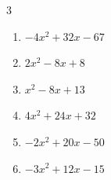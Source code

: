 \begin{multicols}{3}
\begin{enumerate}
  \item $-4x^{2}+32x-67$


  \item $2x^{2}-8x+8$


  \item $x^{2}-8x+13$


  \item $4x^{2}+24x+32$


  \item $-2x^{2}+20x-50$


  \item $-3x^{2}+12x-15$


\end{enumerate}
\end{multicols}

\newpage
\resetdrill

